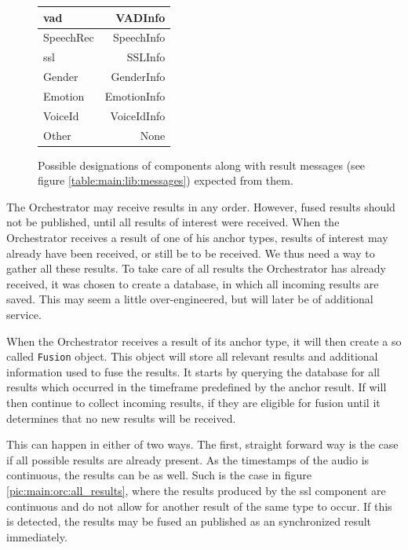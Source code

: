 \begin{figure}[]
	\centering
	\begin{tabular}{| l | r |}
		\hline
		\gls{vad} 		& VADInfo	 	\\ \hline
		SpeechRec		& SpeechInfo		\\ \hline
		\gls{ssl}		& SSLInfo		\\ \hline
		Gender			& GenderInfo		\\ \hline
		Emotion			& EmotionInfo		\\ \hline
		VoiceId			& VoiceIdInfo		\\ \hline
		Other 			& None	 	\\ \hline
	\end{tabular}
	\caption{Possible designations of components along with result messages (see figure \ref{table:main:lib:messages}) expected from them.}
	\label{table:main:designations}
\end{figure}

The Orchestrator may receive results in any order.
However, fused results should not be published, until all results of interest were received.
When the Orchestrator receives a result of one of his anchor types, results of interest may already have been received, or still be to be received.
We thus need a way to gather all these results.
To take care of all results the Orchestrator has already received, it was chosen to create a database, in which all incoming results are saved.
This may seem a little over-engineered, but will later be of additional service.

When the Orchestrator receives a result of its anchor type, it will then create a so called \texttt{Fusion} object.
This object will store all relevant results and additional information used to fuse the results.
It starts by querying the database for all results which occurred in the timeframe predefined by the anchor result.
If will then continue to collect incoming results, if they are eligible for fusion until it determines that no new results will be received.

This can happen in either of two ways.
The first, straight forward way is the case if all possible results are already present.
As the timestamps of the audio is continuous, the results can be as well.
Such is the case in figure \ref{pic:main:orc:all_results}, where the results produced by the \gls{ssl} component are continuous and do not allow for another result of the same type to occur.
If this is detected, the results may be fused an published as an synchronized result immediately.

